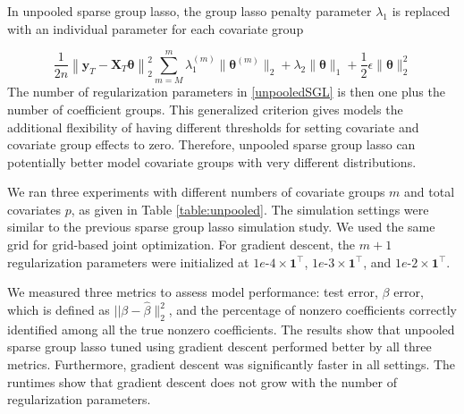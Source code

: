 \documentclass[10pt,letterpaper]{article}
\begin{document}
In unpooled sparse group lasso, the group lasso penalty parameter $\lambda_1$ is replaced with an individual parameter for each covariate group

\begin{equation}
\frac{1}{2n} 
\left \| \boldsymbol{y}_T - \boldsymbol{X}_T \boldsymbol{\theta} \right \|^2_2
\sum_{m=M}^m \lambda_1^{(m)} \| \boldsymbol \theta^{(m)} \|_2
+ \lambda_2 \| \boldsymbol \theta \|_1
+ \frac{1}{2} \epsilon \| \boldsymbol\theta \|_2^2
\label{unpooledSGL}
\end{equation}
The number of regularization parameters in \eqref{unpooledSGL} is then one plus the number of coefficient groups. This generalized criterion gives models the additional flexibility of having different thresholds for setting covariate and covariate group effects to zero. Therefore, unpooled sparse group lasso can potentially better model covariate groups with very different distributions.

We ran three experiments with different numbers of covariate groups $m$ and total covariates $p$, as given in Table \ref{table:unpooled}. The simulation settings were similar to the previous sparse group lasso simulation study. We used the same grid for grid-based joint optimization. For gradient descent, the $m+1$ regularization parameters were initialized at $1e\text{-}4 \times \boldsymbol 1^\top$, $1e\text{-}3 \times \boldsymbol 1^\top$, and $1e\text{-}2 \times \boldsymbol 1^\top$.

We measured three metrics to assess model performance: test error, $\beta$ error, which is defined as $\lvert \lvert \beta - \hat \beta \|_2 ^2$, and the percentage of nonzero coefficients correctly identified among all the true nonzero coefficients. The results show that unpooled sparse group lasso tuned using gradient descent performed better by all three metrics. Furthermore, gradient descent was significantly faster in all settings. The runtimes show that gradient descent does not grow with the number of regularization parameters.
\end{document}
